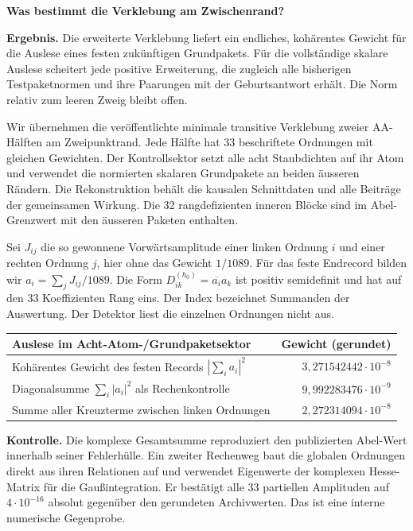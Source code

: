 \documentclass[11pt,a4paper]{article}
\newcommand{\sect}[1]{\par\vspace{4pt}{\large\bfseries\color{teal}#1}\par}
\newcommand{\titleline}[1]{{\LARGE\bfseries #1}\par\vspace{5pt}}
\newcommand{\callout}[1]{\par\noindent\colorbox{soft}{\parbox{\dimexpr\linewidth-2\fboxsep\relax}{\vspace{3pt}#1\vspace{3pt}}}\par}
\begin{document}
\titleline{Was bestimmt die Verklebung am Zwischenrand?}
\callout{\textbf{Ergebnis.} Die erweiterte Verklebung liefert ein endliches, kohärentes Gewicht für die Auslese eines festen zukünftigen Grundpakets. Für die vollständige skalare Auslese scheitert jede positive Erweiterung, die zugleich alle bisherigen Testpaketnormen und ihre Paarungen mit der Geburtsantwort erhält. Die Norm relativ zum leeren Zweig bleibt offen.}

\sect{Ein späteres, fest vorgegebenes Record}
Wir übernehmen die veröffentlichte minimale transitive Verklebung zweier AA-Hälften am Zweipunktrand. Jede Hälfte hat 33 beschriftete Ordnungen mit gleichen Gewichten. Der Kontrollsektor setzt alle acht Staubdichten auf ihr Atom und verwendet die normierten skalaren Grundpakete an beiden äusseren Rändern. Die Rekonstruktion behält die kausalen Schnittdaten und alle Beiträge der gemeinsamen Wirkung. Die 32 rangdefizienten inneren Blöcke sind im Abel-Grenzwert mit den äusseren Paketen enthalten.

Sei $J_{ij}$ die so gewonnene Vorwärtsamplitude einer linken Ordnung $i$ und einer rechten Ordnung $j$, hier ohne das Gewicht $1/1089$. Für das feste Endrecord bilden wir $a_i=\sum_j J_{ij}/1089$. Die Form $D^{(h_0)}_{ik}=\overline{a_i}a_k$ ist positiv semidefinit und hat auf den 33 Koeffizienten Rang eins. Der Index bezeichnet Summanden der Auswertung. Der Detektor liest die einzelnen Ordnungen nicht aus.

\begin{center}\begin{tabularx}{\linewidth}{@{}Xr@{}}\toprule
Auslese im Acht-Atom-/Grundpaketsektor & Gewicht (gerundet)\\\midrule
Kohärentes Gewicht des festen Records $|\sum_i a_i|^2$ & $3{,}271542442\cdot10^{-8}$\\
Diagonalsumme $\sum_i|a_i|^2$ als Rechenkontrolle & $9{,}992283476\cdot10^{-9}$\\
Summe aller Kreuzterme zwischen linken Ordnungen & $2{,}272314094\cdot10^{-8}$\\\bottomrule\end{tabularx}\end{center}
\textbf{Kontrolle.} Die komplexe Gesamtsumme reproduziert den publizierten Abel-Wert innerhalb seiner Fehlerhülle. Ein zweiter Rechenweg baut die globalen Ordnungen direkt aus ihren Relationen auf und verwendet Eigenwerte der komplexen Hesse-Matrix für die Gaußintegration. Er bestätigt alle 33 partiellen Amplituden auf $4\cdot10^{-16}$ absolut gegenüber den gerundeten Archivwerten. Das ist eine interne numerische Gegenprobe.
\end{document}
